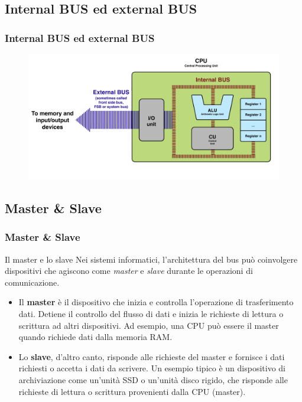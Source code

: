\subsection[Internal BUS ed external BUS]{Internal BUS ed external BUS}
\begin{frame}
	\frametitle{Internal BUS ed external BUS}
	  
	\begin{figure}[!htbp]
		\centering
		\includegraphics[width=1.0\linewidth]{images/6_bus/bus_internal_external.pdf}
	\end{figure}
\end{frame}



\subsection[Master \& Slave]{Master \& Slave}
\begin{frame}
	\frametitle{Master \& Slave}
	
	\begin{block}{Il master e lo slave}
		Nei sistemi informatici, l'architettura del bus può coinvolgere dispositivi che agiscono come \textit{master} e \textit{slave} durante le operazioni di comunicazione.
		\begin{itemize}
			\item Il \textbf{master} è il dispositivo che inizia e controlla l'operazione di trasferimento dati. Detiene il controllo del flusso di dati e inizia le richieste di lettura o scrittura ad altri dispositivi. Ad esempio, una CPU può essere il master quando richiede dati dalla memoria RAM.
			\item Lo \textbf{slave}, d'altro canto, risponde alle richieste del master e fornisce i dati richiesti o accetta i dati da scrivere. Un esempio tipico è un dispositivo di archiviazione come un'unità SSD o un'unità disco rigido, che risponde alle richieste di lettura o scrittura provenienti dalla CPU (master).
		\end{itemize}
		
	\end{block}
	
\end{frame}


